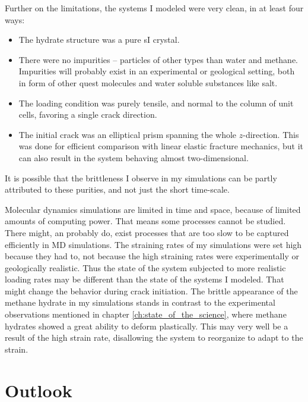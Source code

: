 Further on the limitations, the systems I modeled were very clean, in at least four ways: 
\begin{itemize}
\item The hydrate structure was a pure sI crystal. 
\item There were no impurities -- particles of other types than water and methane. Impurities will probably exist in an experimental or geological setting, both in form of other quest molecules and water soluble substances like salt. 
\item The loading condition was purely tensile, and normal to the column of unit cells, favoring a single crack direction.
\item The initial crack was an elliptical prism spanning the whole $z$-direction. This was done for efficient comparison with linear elastic fracture mechanics, but it can also result in the system behaving almost two-dimensional. 
\end{itemize}
It is possible that the brittleness I observe in my simulations can be partly attributed to these purities, and not just the short time-scale.

Molecular dynamics simulations are limited in time and space, because of limited amounts of computing power. That means some processes cannot be studied. There might, an probably do, exist processes that are too slow to be captured efficiently in MD simulations. The straining rates of my simulations were set high because they had to, not because the high straining rates were experimentally or geologically realistic. Thus the state of the system subjected to more realistic loading rates may be different than the state of the systems I modeled. That might change the behavior during crack initiation. The brittle appearance of the methane hydrate in my simulations stands in contrast to the experimental observations mentioned in chapter \ref{ch:state_of_the_science}, where methane hydrates showed a great ability to deform plastically. This may very well be a result of the high strain rate, disallowing the system to reorganize to adapt to the strain.


\section{Outlook}

